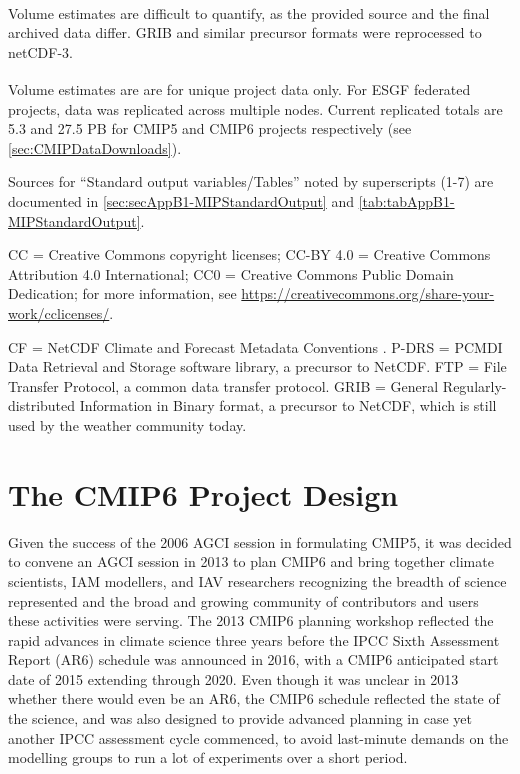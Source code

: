 \documentclass[manuscript]{copernicus}
\newcommand{\mycomment}[1]{}
\begin{document}
\begin{table}[htp]
{{}\textsuperscript{\textdagger}Volume estimates are difficult to quantify, as the provided source and the final archived data differ. GRIB and similar precursor formats were reprocessed to netCDF-3.

{}\textsuperscript{\textdaggerdbl}Volume estimates are are for unique project data only. For ESGF federated projects, data was replicated across multiple nodes. Current replicated totals are 5.3 and 27.5 PB for CMIP5 and CMIP6 projects respectively (see \autoref{sec:CMIPDataDownloads}).

Sources for ``Standard output variables/Tables'' noted by superscripts (1-7) are documented in \autoref{sec:secAppB1-MIPStandardOutput} and \autoref{tab:tabAppB1-MIPStandardOutput}.

CC = Creative Commons copyright licenses; CC-BY 4.0 = Creative Commons Attribution 4.0 International; CC0 = Creative Commons Public Domain Dedication; for more information, see \url{https://creativecommons.org/share-your-work/cclicenses/}.

CF = NetCDF Climate and Forecast Metadata Conventions \citep{eaton_netcdf_2024}. P-DRS = PCMDI Data Retrieval and Storage software library, a precursor to NetCDF. FTP = File Transfer Protocol, a common data transfer protocol. GRIB = General Regularly-distributed Information in Binary format, a precursor to NetCDF, which is still used by the weather community today.}
\end{table}
\mycomment{
Also WGNE diagnostics, which likely built the original AMIP output list - https://web.archive.org/web/19970825000822/http://www-pcmdi.llnl.gov/amip/output/outlist.html and https://pcmdi.llnl.gov/mips/amip/OUTPUT/WGNEDIAGS/
}


\section{The CMIP6 Project Design}
\label{sec:cmip6ProjectDesign}

Given the success of the 2006 AGCI session in formulating CMIP5, it was decided to convene an AGCI session in 2013 to plan CMIP6 and bring together climate scientists, IAM modellers, and IAV researchers recognizing the breadth of science represented and the broad and growing community of contributors and users these activities were serving. The 2013 CMIP6 planning workshop reflected the rapid advances in climate science three years before the IPCC Sixth Assessment Report (AR6) schedule was announced in 2016, with a CMIP6 anticipated start date of 2015 extending through 2020. Even though it was unclear in 2013 whether there would even be an AR6, the CMIP6 schedule reflected the state of the science, and was also designed to provide advanced planning in case yet another IPCC assessment cycle commenced, to avoid last-minute demands on the modelling groups to run a lot of experiments over a short period.
\end{document}
